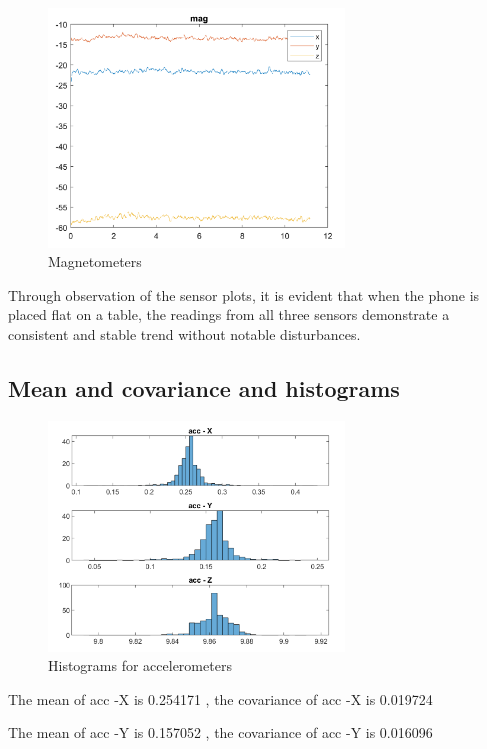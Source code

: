 \begin{figure}[H]
 \centering
 \includegraphics[width=0.7\textwidth]{images/magnetometers.png}
 \caption{Magnetometers}
 \label{mag}
\end{figure}

Through observation of the sensor plots, it is evident that when the phone is placed flat on a table, the readings from all three sensors demonstrate a consistent and stable trend without notable disturbances.


\subsection{Mean and covariance and histograms}

\begin{figure}[H]
 \centering
 \includegraphics[width=0.7\textwidth]{images/histogramacc.png}
 \caption{Histograms for accelerometers}
 \label{hisacc}
\end{figure}

The mean of acc -X is 0.254171 , the covariance of acc -X is 0.019724  

The mean of acc -Y is 0.157052 , the covariance of acc -Y is 0.016096 


